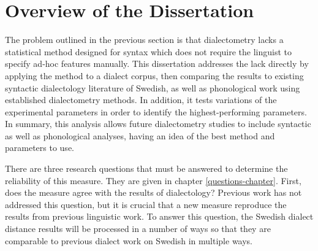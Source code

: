 



\section{Overview of the Dissertation}

The problem outlined in the previous section is that dialectometry
lacks a statistical method designed for syntax which does not require
the linguist to specify ad-hoc features manually. This dissertation
addresses the lack directly by applying the method to a dialect
corpus, then comparing the results to existing syntactic dialectology
literature of Swedish, as well as phonological work using established
dialectometry methods. In addition, it tests variations of the
experimental parameters in order to identify the highest-performing
parameters. In summary, this analysis allows future dialectometry
studies to include syntactic as well as phonological analyses, having
an idea of the best method and parameters to use.

There are three research questions that must be answered to determine
the reliability of this measure. They are given in chapter
\ref{questions-chapter}. First, does the measure agree with the
results of dialectology? Previous work has not addressed this
question, but it is crucial that a new measure reproduce the results
from previous linguistic work. To answer this question, the
Swedish dialect distance results will be processed in a number of ways
so that they are comparable to previous dialect work on Swedish in
multiple ways.

